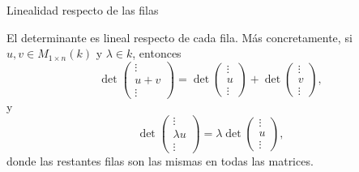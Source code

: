 \begin{frame}[allowframebreaks]{Linealidad respecto de las filas}

\begin{proposition}
El determinante es lineal respecto de cada fila. Más concretamente,
si \(u,v\in M_{1\times n}(k)\) y \(\lambda\in k\), entonces
\[
\det
\left(
\begin{array}{c}
\vdots\\
\hline
u+v\\
\hline
\vdots
\end{array}
\right)
=
\det
\left(
\begin{array}{c}
\vdots\\
\hline
u\\
\hline
\vdots
\end{array}
\right)
+
\det
\left(
\begin{array}{c}
\vdots\\
\hline
v\\
\hline
\vdots
\end{array}
\right),
\]
y
\[
\det
\left(
\begin{array}{c}
\vdots\\
\hline
\lambda u\\
\hline
\vdots
\end{array}
\right)
=
\lambda
\det
\left(
\begin{array}{c}
\vdots\\
\hline
u\\
\hline
\vdots
\end{array}
\right),
\]
donde las restantes filas son las mismas en todas las matrices.
\end{proposition}

\end{frame}

